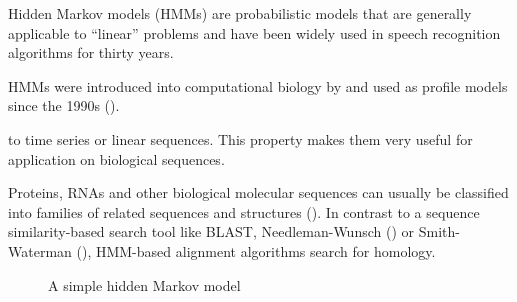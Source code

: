 Hidden Markov models (HMMs) are probabilistic models that are generally
applicable to ``linear'' problems and have been widely used in speech
recognition algorithms for thirty years. 

HMMs were introduced into computational biology by \cite{churchill1989} and used
as profile models since the 1990s (\cite{krogh1994}).

to time series or linear sequences.  This property makes them very useful for
application on biological sequences.

Proteins, RNAs and other biological molecular sequences can usually be
classified into families of related sequences and structures
(\cite{henikoff1997}).  In contrast to a sequence similarity-based search tool
like BLAST, Needleman-Wunsch (\cite{needleman1970}) or Smith-Waterman
(\cite{smith1981}), HMM-based alignment algorithms search for homology. 

\begin{figure}[h]
	\begin{center}
		\def\svgwidth{0.8\textwidth}
		
	\end{center}
	\caption[A simple hidden Markov model]{A simple hidden Markov model}
	\label{fig:hmm}
\end{figure}
